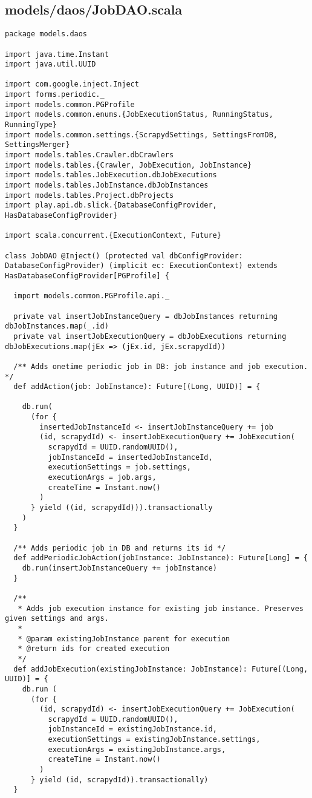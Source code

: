 \subsection{models/daos/JobDAO.scala}
\begin{lstlisting}
package models.daos

import java.time.Instant
import java.util.UUID

import com.google.inject.Inject
import forms.periodic._
import models.common.PGProfile
import models.common.enums.{JobExecutionStatus, RunningStatus, RunningType}
import models.common.settings.{ScrapydSettings, SettingsFromDB, SettingsMerger}
import models.tables.Crawler.dbCrawlers
import models.tables.{Crawler, JobExecution, JobInstance}
import models.tables.JobExecution.dbJobExecutions
import models.tables.JobInstance.dbJobInstances
import models.tables.Project.dbProjects
import play.api.db.slick.{DatabaseConfigProvider, HasDatabaseConfigProvider}

import scala.concurrent.{ExecutionContext, Future}

class JobDAO @Inject() (protected val dbConfigProvider: DatabaseConfigProvider) (implicit ec: ExecutionContext) extends HasDatabaseConfigProvider[PGProfile] {

  import models.common.PGProfile.api._

  private val insertJobInstanceQuery = dbJobInstances returning dbJobInstances.map(_.id)
  private val insertJobExecutionQuery = dbJobExecutions returning dbJobExecutions.map(jEx => (jEx.id, jEx.scrapydId))

  /** Adds onetime periodic job in DB: job instance and job execution. */
  def addAction(job: JobInstance): Future[(Long, UUID)] = {

    db.run(
      (for {
        insertedJobInstanceId <- insertJobInstanceQuery += job
        (id, scrapydId) <- insertJobExecutionQuery += JobExecution(
          scrapydId = UUID.randomUUID(),
          jobInstanceId = insertedJobInstanceId,
          executionSettings = job.settings,
          executionArgs = job.args,
          createTime = Instant.now()
        )
      } yield ((id, scrapydId))).transactionally
    )
  }

  /** Adds periodic job in DB and returns its id */
  def addPeriodicJobAction(jobInstance: JobInstance): Future[Long] = {
    db.run(insertJobInstanceQuery += jobInstance)
  }

  /**
   * Adds job execution instance for existing job instance. Preserves given settings and args.
   *
   * @param existingJobInstance parent for execution
   * @return ids for created execution
   */
  def addJobExecution(existingJobInstance: JobInstance): Future[(Long, UUID)] = {
    db.run (
      (for {
        (id, scrapydId) <- insertJobExecutionQuery += JobExecution(
          scrapydId = UUID.randomUUID(),
          jobInstanceId = existingJobInstance.id,
          executionSettings = existingJobInstance.settings,
          executionArgs = existingJobInstance.args,
          createTime = Instant.now()
        )
      } yield (id, scrapydId)).transactionally)
  }


\end{lstlisting}

